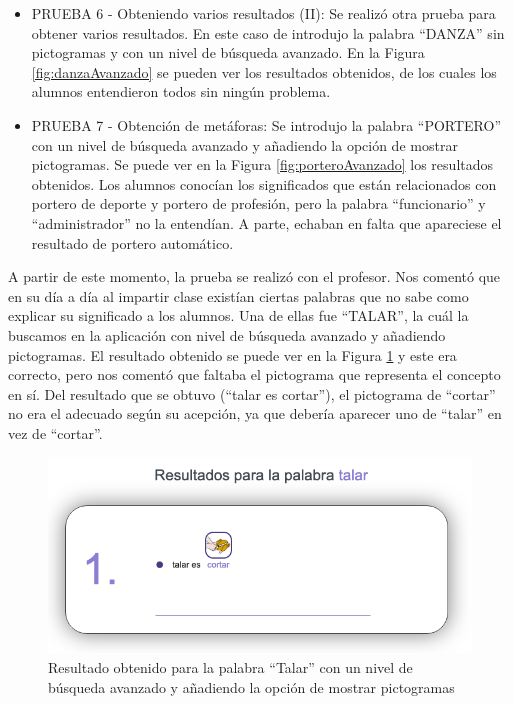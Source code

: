 \begin{itemize}
	\item PRUEBA 6 - Obteniendo varios resultados (II):  Se realizó otra prueba para obtener varios resultados. En este caso de introdujo la palabra ``DANZA''  sin pictogramas y con un nivel de búsqueda avanzado. En la Figura \ref{fig:danzaAvanzado} se pueden ver los resultados obtenidos, de los cuales los alumnos entendieron todos sin ningún problema.
	
	\item PRUEBA 7 - Obtención de metáforas:  Se introdujo la palabra ``PORTERO'' con un nivel de búsqueda avanzado y añadiendo la opción de mostrar pictogramas. Se puede ver en la Figura \ref{fig:porteroAvanzado} los resultados obtenidos. Los alumnos conocían los significados que están relacionados con portero de deporte y portero de profesión, pero la palabra ``funcionario'' y ``administrador'' no la entendían. A parte, echaban en falta que apareciese el resultado de portero automático.
\end{itemize}


A partir de este momento, la prueba se realizó con el profesor. Nos comentó que en su día a día al impartir clase existían ciertas palabras que no sabe como explicar su significado a los alumnos.
Una de ellas fue ``TALAR'', la cuál la buscamos en la aplicación con nivel de búsqueda avanzado y añadiendo pictogramas. El resultado obtenido se puede ver en la Figura \ref{fig:talarAvanzado} y este era correcto, pero nos comentó que faltaba el pictograma que representa el concepto en sí. Del resultado que se obtuvo (``talar es cortar''), el pictograma de ``cortar'' no era el adecuado según su acepción, ya que debería aparecer uno de ``talar'' en vez de ``cortar''.

\begin{figure}[!h]
	\includegraphics[width=.7\textwidth]{Imagenes/Bitmap/Capitulo4/EvaluacionFinal/talaravanzado.png}
	\centering
	\caption{Resultado obtenido para la palabra ``Talar'' con un nivel de búsqueda avanzado y añadiendo la opción de mostrar pictogramas}
	\label{fig:talarAvanzado}
\end{figure}

